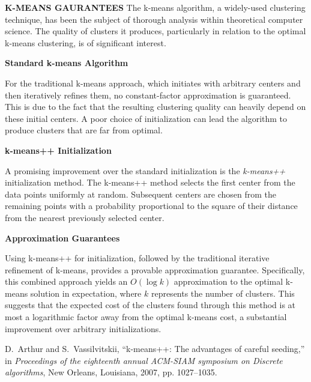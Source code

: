 \textbf{K-MEANS GAURANTEES}
The k-means algorithm, a widely-used clustering technique, has been the subject of thorough analysis within theoretical computer science. The quality of clusters it produces, particularly in relation to the optimal k-means clustering, is of significant interest.

\textbf{Standard k-means Algorithm}

For the traditional k-means approach, which initiates with arbitrary centers and then iteratively refines them, no constant-factor approximation is guaranteed. This is due to the fact that the resulting clustering quality can heavily depend on these initial centers. A poor choice of initialization can lead the algorithm to produce clusters that are far from optimal.

\textbf{k-means++ Initialization}

A promising improvement over the standard initialization is the \textit{k-means++} initialization method. The k-means++ method selects the first center from the data points uniformly at random. Subsequent centers are chosen from the remaining points with a probability proportional to the square of their distance from the nearest previously selected center.

\textbf{Approximation Guarantees}

Using k-means++ for initialization, followed by the traditional iterative refinement of k-means, provides a provable approximation guarantee. Specifically, this combined approach yields an $O(\log k)$ approximation to the optimal k-means solution in expectation, where $k$ represents the number of clusters. This suggests that the expected cost of the clusters found through this method is at most a logarithmic factor away from the optimal k-means cost, a substantial improvement over arbitrary initializations.


D.~Arthur and S.~Vassilvitskii, ``k-means++: The advantages of careful seeding,'' in \textit{Proceedings of the eighteenth annual ACM-SIAM symposium on Discrete algorithms}, New Orleans, Louisiana, 2007, pp. 1027--1035.




%

%
%
